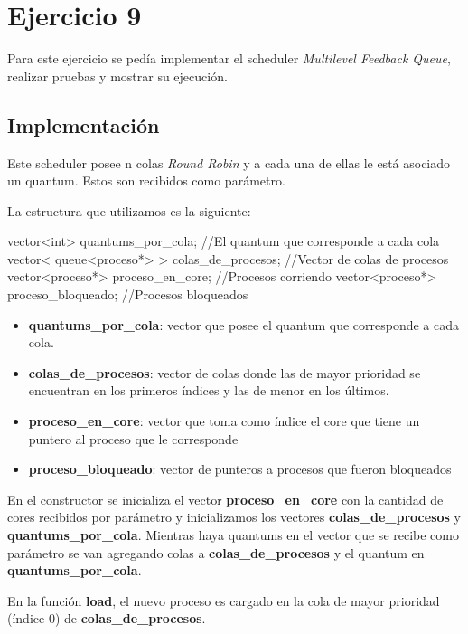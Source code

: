 \section{Ejercicio 9}

Para este ejercicio se pedía implementar el scheduler \textit{Multilevel Feedback Queue}, realizar pruebas y mostrar su ejecución.

\subsection{Implementación}

Este scheduler posee n colas \emph{Round Robin} y a cada una de ellas le está asociado un quantum. Estos son recibidos como parámetro.

La estructura que utilizamos es la siguiente:

		vector<int> quantums_por_cola; //El quantum que corresponde a cada cola
		vector< queue<proceso*> > colas_de_procesos; //Vector de colas de procesos
		vector<proceso*> proceso_en_core; //Procesos corriendo
		vector<proceso*> proceso_bloqueado; //Procesos bloqueados

\begin{itemize}

\item \textbf{quantums\_por\_cola}: vector que posee el quantum que corresponde a cada cola.

\item \textbf{colas\_de\_procesos}: vector de colas donde las de mayor prioridad se encuentran en los primeros índices y las de menor en los últimos.

\item \textbf{proceso\_en\_core}: vector que toma como índice el core que tiene un puntero al proceso que le corresponde

\item \textbf{proceso\_bloqueado}: vector de punteros a procesos que fueron bloqueados

\end{itemize}

En el constructor se inicializa el vector \textbf{proceso\_en\_core} con la cantidad de cores recibidos por parámetro y inicializamos los vectores \textbf{colas\_de\_procesos} y \textbf{quantums\_por\_cola}. Mientras haya quantums en el vector que se recibe como parámetro se van agregando colas a \textbf{colas\_de\_procesos} y el quantum en \textbf{quantums\_por\_cola}.

En la función \textbf{load}, el nuevo proceso es cargado en la cola de mayor prioridad (índice 0) de \textbf{colas\_de\_procesos}.

